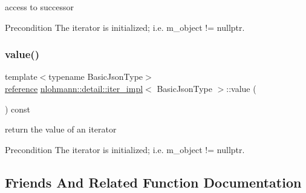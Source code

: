 access to successor 

\begin{DoxyPrecond}{Precondition}
The iterator is initialized; i.\+e. {\ttfamily m\+\_\+object != nullptr}. 
\end{DoxyPrecond}
\mbox{\label{classnlohmann_1_1detail_1_1iter__impl_ab447c50354c6611fa2ae0100ac17845c}} 
\subsubsection{\texorpdfstring{value()}{value()}}
{\footnotesize\ttfamily template$<$typename Basic\+Json\+Type$>$ \\
\mbox{\hyperlink{classnlohmann_1_1detail_1_1iter__impl_a5be8001be099c6b82310f4d387b953ce}{reference}} \mbox{\hyperlink{classnlohmann_1_1detail_1_1iter__impl}{nlohmann\+::detail\+::iter\+\_\+impl}}$<$ Basic\+Json\+Type $>$\+::value (\begin{DoxyParamCaption}{ }\end{DoxyParamCaption}) const\hspace{0.3cm}{\ttfamily [inline]}}



return the value of an iterator 

\begin{DoxyPrecond}{Precondition}
The iterator is initialized; i.\+e. {\ttfamily m\+\_\+object != nullptr}. 
\end{DoxyPrecond}


\subsection{Friends And Related Function Documentation}
\mbox{\label{classnlohmann_1_1detail_1_1iter__impl_a94108d1a7563e103534f23eb5c1ee175}} 
